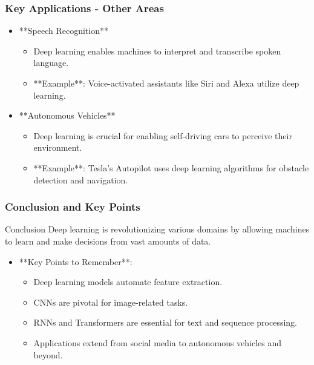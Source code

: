 \documentclass[aspectratio=169]{beamer}
\begin{document}
\begin{frame}[fragile]
    \frametitle{Key Applications - Other Areas}
    \begin{itemize}
        \item **Speech Recognition**
        \begin{itemize}
            \item Deep learning enables machines to interpret and transcribe spoken language.
            \item **Example**: Voice-activated assistants like Siri and Alexa utilize deep learning.
        \end{itemize}
        
        \item **Autonomous Vehicles**
        \begin{itemize}
            \item Deep learning is crucial for enabling self-driving cars to perceive their environment.
            \item **Example**: Tesla's Autopilot uses deep learning algorithms for obstacle detection and navigation.
        \end{itemize}
    \end{itemize}
\end{frame}

\begin{frame}[fragile]
    \frametitle{Conclusion and Key Points}
    \begin{block}{Conclusion}
        Deep learning is revolutionizing various domains by allowing machines to learn and make decisions from vast amounts of data. 
    \end{block}
    \begin{itemize}
        \item **Key Points to Remember**:
        \begin{itemize}
            \item Deep learning models automate feature extraction.
            \item CNNs are pivotal for image-related tasks.
            \item RNNs and Transformers are essential for text and sequence processing.
            \item Applications extend from social media to autonomous vehicles and beyond.
        \end{itemize}
    \end{itemize}
\end{frame}
\end{document}
